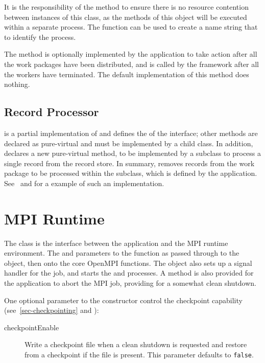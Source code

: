 It is the
responsibility of the  method to ensure there is no
resource contention between instances of this class, as the methods of this
object will be executed within a separate process. The
 function can be used to create a name string
that to identify the process.

The  method is optionally implemented by the
application to take action after all the work packages have been distributed,
and is called by the framework after all the workers have terminated. The
default implementation of this method does nothing.

\subsection{Record Processor}
\label{sec-recordprocessor}
 is a partial implementation of 
 and defines the 
of the  interface; other methods are declared as
pure-virtual and must be implemented by a child class. In addition,
 declares a new pure-virtual method,
 to be implemented by a subclass to process a single
record from the record store. In summary,  removes
records from the work package to be processed within the subclass,
which is defined by the application.
See~ and  for a example of
such an implementation.

\section{MPI Runtime}
\label{sec-mpiruntime}

The  class is the interface between the application and the
MPI runtime environment. The  and  parameters
to the  function as passed through to the 
object, then onto the core OpenMPI functions. The  object 
also sets up a signal handler for the job, and starts the 
and  processes.  A method is also provided for the application
to abort the MPI job, providing for a somewhat clean shutdown.

One optional parameter to the  constructor control the
checkpoint capability (see~\ref{sec-checkpointing} and ):
\begin{description}
\item[checkpointEnable] Write a checkpoint file when a clean shutdown is
requested and restore from a checkpoint if the file is present. This parameter
defaults to {\tt false}.
\end{description}

